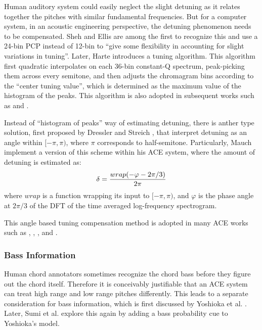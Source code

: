 Human auditory system could easily neglect the slight detuning as it relates together the pitches with similar fundamental frequencies. But for a computer system, in an acoustic engineering perspective, the detuning phenomenon needs to be compensated. Sheh and Ellis \cite{sheh2003chord} are among the first to recognize this and use a 24-bin PCP instead of 12-bin to ``give some flexibility in accounting for slight variations in tuning''. Later, Harte \cite{harte2005automatic} introduces a tuning algorithm. This algorithm first quadratic interpolates on each 36-bin constant-Q spectrum, peak-picking them across every semitone, and then adjusts the chromagram bins according to the ``center tuning value'', which is determined as the maximum value of the histogram of the peaks. This algorithm is also adopted in subsequent works such as \cite{bello2005robust} and \cite{harte2006detecting}.

Instead of ``histogram of peaks'' way of estimating detuning, there is anther type solution, first proposed by Dressler and Streich \cite{dressler2007tuning}, that interpret detuning as an angle within $[-\pi,\pi)$, where $\pi$ corresponds to half-semitone. Particularly, Mauch \cite{mauch2010automatic} implement a version of this scheme within his ACE system, where the amount of detuning is estimated as:
\begin{equation}\label{eq:2-tuning}
\delta = { {wrap(-\varphi-{2\pi}/3)} \over {2\pi} }
\end{equation}
where $wrap$ is a function wrapping its input to $[-\pi,\pi)$, and $\varphi$ is the phase angle at $2\pi/3$ of the DFT of the time averaged log-frequency spectrogram.

This angle based tuning compensation method is adopted in many ACE works such as \cite{papadopoulos2007large}, \cite{papadopoulos2008simultaneous}, \cite{mauch2008discrete}, \cite{reed2009minimum} and \cite{noland2009influences}.

\subsubsection{Bass Information}
Human chord annotators sometimes recognize the chord bass before they figure out the chord itself. Therefore it is conceivably justifiable that an ACE system can treat high range and low range pitches differently. This leads to a separate consideration for bass information, which is first discussed by Yoshioka et al. \cite{yoshioka2004automatic}. Later, Sumi et al. \cite{sumi2008automatic} explore this again by adding a bass probability cue to Yoshioka's model.


